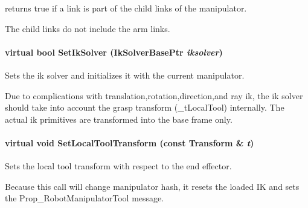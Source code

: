returns true if a link is part of the child links of the manipulator. 

The child links do not include the arm links. \hypertarget{classOpenRAVE_1_1RobotBase_1_1Manipulator_ae2b496857b0c5970bf0544e938e96125}{
\paragraph[{SetIkSolver}]{\setlength{\rightskip}{0pt plus 5cm}virtual bool SetIkSolver (IkSolverBasePtr {\em iksolver})}\hfill}
\label{classOpenRAVE_1_1RobotBase_1_1Manipulator_ae2b496857b0c5970bf0544e938e96125}


Sets the ik solver and initializes it with the current manipulator. 

Due to complications with translation,rotation,direction,and ray ik, the ik solver should take into account the grasp transform (\_\-tLocalTool) internally. The actual ik primitives are transformed into the base frame only. \hypertarget{classOpenRAVE_1_1RobotBase_1_1Manipulator_a853353ac859599b30cee9e99b17fa728}{
\paragraph[{SetLocalToolTransform}]{\setlength{\rightskip}{0pt plus 5cm}virtual void SetLocalToolTransform (const Transform \& {\em t})}\hfill}
\label{classOpenRAVE_1_1RobotBase_1_1Manipulator_a853353ac859599b30cee9e99b17fa728}


Sets the local tool transform with respect to the end effector. 

Because this call will change manipulator hash, it resets the loaded IK and sets the Prop\_\-RobotManipulatorTool message. 